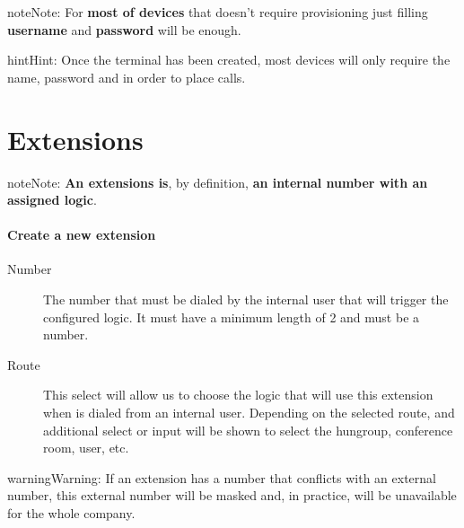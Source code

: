 \documentclass[letterpaper,10pt,english]{sphinxmanual}
\begin{document}
\begin{notice}{note}{Note:}
For \textbf{most of devices} that doesn't require provisioning just
filling \textbf{username} and \textbf{password} will be enough.
\end{notice}

\begin{notice}{hint}{Hint:}
Once the terminal has been created, most devices will only
require the name, password and {\hyperref[getting_started/internal_calls/brand_portal:domain\string-per\string-company]{}}
in order to place calls.
\end{notice}


\section{Extensions}
\label{company/extensions:extensions}\label{company/extensions::doc}
\begin{notice}{note}{Note:}
\textbf{An extensions is}, by definition, \textbf{an internal number with an
assigned logic}.
\end{notice}
\paragraph{Create a new extension}
\begin{description}
\item[{Number}] \leavevmode{}\label{company/extensions:term-number}
The number that must be dialed by the internal user that will trigger
the configured logic. It must have a minimum length of 2 and must be
a number.

\item[{Route}] \leavevmode{}\label{company/extensions:term-route}
This select will allow us to choose the logic that will use this
extension when is dialed from an internal user. Depending on the selected
route, and additional select or input will be shown to select the
hungroup, conference room, user, etc.

\end{description}

\begin{notice}{warning}{Warning:}
If an extension has a number that conflicts with an external
number, this external number will be masked and, in practice, will be
unavailable for the whole company.
\end{notice}
\end{document}
